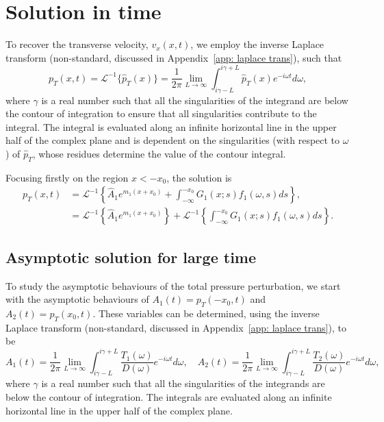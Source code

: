 \documentclass[12pt]{../style-files/ociamthesis}
\begin{document}
\section{Solution in time}
To recover the transverse velocity, $v_x(x, t)$, we employ the inverse Laplace transform (non-standard, discussed in Appendix~\ref{app: laplace trans}), such that
\begin{equation}
p_T(x,t) = \mathcal{L}^{-1}\{\hat{p}_T(x)\} = \frac{1}{2\pi} \lim_{L \to \infty} \int_{i\gamma - L}^{i\gamma + L} \hat{p}_T(x) e^{-i\omega t} d\omega,
\label{laplace transform}
\end{equation}
where $\gamma$ is a real number such that all the singularities of the integrand are below the contour of integration to ensure that all singularities contribute to the integral. The integral is evaluated along an infinite horizontal line in the upper half of the complex plane and is dependent on the singularities (with respect to $\omega$) of $\hat{p}_T$, whose residues determine the value of the contour integral.

Focusing firstly on the region $x < -x_0$, the solution is
\newcommand{\e}{\epsilon}
\begin{align}
p_T(x, t) &= \mathcal{L}^{-1} \left\{ \hat{A}_1 e^{m_1(x + x_0)} + \int_{-\infty}^{-x_0} G_1(x; s)f_1(\omega, s)ds \right\}, \\
&= \mathcal{L}^{-1} \left\{ \hat{A}_1 e^{m_1(x + x_0)} \right\} + \mathcal{L}^{-1} \left\{ \int_{-\infty}^{-x_0} G_1(x; s)f_1(\omega, s)ds \right\}.
\end{align}


\subsection{Asymptotic solution for large time}
To study the asymptotic behaviours of the total pressure perturbation, we start with the asymptotic behaviours of $A_1(t) = p_T(-x_0, t)$ and $A_2(t) = p_T(x_0, t)$. These variables can be determined, using the inverse Laplace transform (non-standard, discussed in Appendix~\ref{app: laplace trans}), to be
\begin{equation}
A_1(t) = \frac{1}{2\pi} \lim_{L \to \infty} \int_{i\gamma - L}^{i\gamma + L} \frac{T_1(\omega)}{D(\omega)} e^{-i\omega t} d\omega, \quad A_2(t) = \frac{1}{2\pi} \lim_{L \to \infty} \int_{i\gamma - L}^{i\gamma + L} \frac{T_2(\omega)}{D(\omega)} e^{-i\omega t} d\omega,
\label{A inv laplace}
\end{equation}
where $\gamma$ is a real number such that all the singularities of the integrands are below the contour of integration. The integrals are evaluated along an infinite horizontal line in the upper half of the complex plane.
\end{document}

